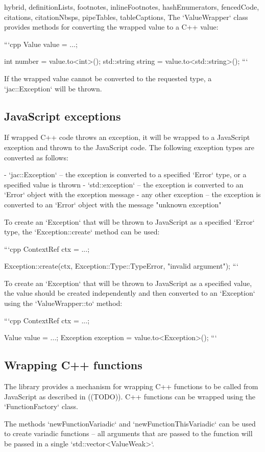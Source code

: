 \begin{markdown*}{%
  hybrid,
  definitionLists,
  footnotes,
  inlineFootnotes,
  hashEnumerators,
  fencedCode,
  citations,
  citationNbsps,
  pipeTables,
  tableCaptions,
}
The `ValueWrapper` class provides methods for converting the wrapped value to a C++ value:

```cpp
Value value = ...;

int number = value.to<int>();
std::string string = value.to<std::string>();
```

If the wrapped value cannot be converted to the requested type, a `jac::Exception` will be thrown.

\subsection{JavaScript exceptions}

If wrapped C++ code throws an exception, it will be wrapped to a JavaScript exception and thrown to the JavaScript code. The following exception types are converted as follows:

  - `jac::Exception` -- the exception is converted to a specified `Error` type, or a specified value is thrown
  - `std::exception` -- the exception is converted to an `Error` object with the exception message
  - any other exception -- the exception is converted to an `Error` object with the message "unknown exception"

To create an `Exception` that will be thrown to JavaScript as a specified `Error` type, the `Exception::create` method can be used:

```cpp
ContextRef ctx = ...;

Exception::create(ctx, Exception::Type::TypeError, "invalid argument");
```

To create an `Exception` that will be thrown to JavaScript as a specified value, the value should be created independently and then converted to an `Exception` using the `ValueWrapper::to` method:

```cpp
ContextRef ctx = ...;

Value value = ...;
Exception exception = value.to<Exception>();
```

\subsection{Wrapping C++ functions}

The library provides a mechanism for wrapping C++ functions to be called from JavaScript as described in ((TODO)). C++ functions can be wrapped using the `FunctionFactory` class.

The methods `newFunctionVariadic` and `newFunctionThisVariadic` can be used to create variadic functions -- all arguments that are
passed to the function will be passed in a single `std::vector<ValueWeak>`.


\end{markdown*}
